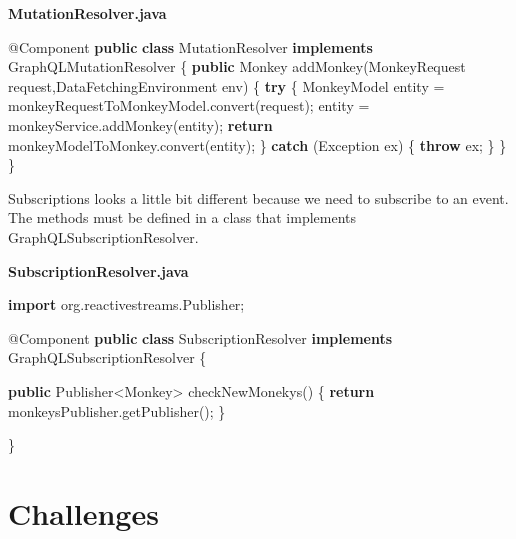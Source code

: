 \documentclass[]{book}
\newenvironment{Shaded}{\begin{snugshade}}{\end{snugshade}}
\newcommand{\KeywordTok}[1]{\textcolor[rgb]{0.13,0.29,0.53}{\textbf{#1}}}
\newcommand{\ImportTok}[1]{#1}
\newcommand{\FunctionTok}[1]{\textcolor[rgb]{0.00,0.00,0.00}{#1}}
\newcommand{\BuiltInTok}[1]{#1}
\newcommand{\AttributeTok}[1]{\textcolor[rgb]{0.77,0.63,0.00}{#1}}
\newcommand{\NormalTok}[1]{#1}
\begin{document}
\textbf{MutationResolver.java}

\begin{Shaded}
\begin{Highlighting}[]
\AttributeTok{@Component}
\KeywordTok{public} \KeywordTok{class}\NormalTok{ MutationResolver }\KeywordTok{implements}\NormalTok{ GraphQLMutationResolver \{}
     \KeywordTok{public}\NormalTok{ Monkey }\FunctionTok{addMonkey}\NormalTok{(MonkeyRequest request,DataFetchingEnvironment env) \{}
        \KeywordTok{try}\NormalTok{ \{}
\NormalTok{            MonkeyModel entity = monkeyRequestToMonkeyModel.}\FunctionTok{convert}\NormalTok{(request);}
\NormalTok{            entity = monkeyService.}\FunctionTok{addMonkey}\NormalTok{(entity);}
            \KeywordTok{return}\NormalTok{ monkeyModelToMonkey.}\FunctionTok{convert}\NormalTok{(entity);}
\NormalTok{        \} }\KeywordTok{catch}\NormalTok{ (}\BuiltInTok{Exception}\NormalTok{ ex) \{}
            \KeywordTok{throw}\NormalTok{ ex;}
\NormalTok{        \}}
\NormalTok{    \}}
\NormalTok{\}}
\end{Highlighting}
\end{Shaded}

Subscriptions looks a little bit different because we need to subscribe
to an event. The methods must be defined in a class that implements
GraphQLSubscriptionResolver.

\textbf{SubscriptionResolver.java}

\begin{Shaded}
\begin{Highlighting}[]
\KeywordTok{import}\ImportTok{ org.reactivestreams.Publisher;}

\AttributeTok{@Component}
\KeywordTok{public} \KeywordTok{class}\NormalTok{ SubscriptionResolver }\KeywordTok{implements}\NormalTok{ GraphQLSubscriptionResolver \{}
 
    \KeywordTok{public}\NormalTok{ Publisher<Monkey> }\FunctionTok{checkNewMonekys}\NormalTok{() \{}
        \KeywordTok{return}\NormalTok{ monkeysPublisher.}\FunctionTok{getPublisher}\NormalTok{();}
\NormalTok{    \}}
        
\NormalTok{\}}
\end{Highlighting}
\end{Shaded}

\section{Challenges}\label{challenges-2}
\end{document}
